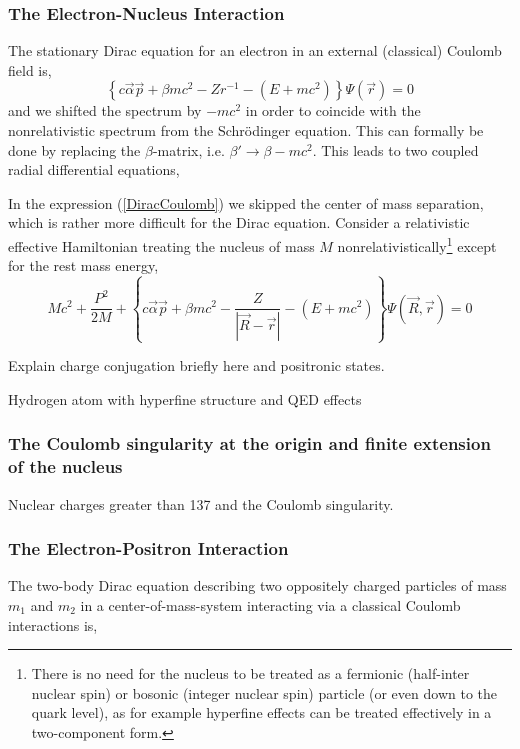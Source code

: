 \documentclass[12pt]{article}
\begin{document}
\subsubsection{\label{Hatom} \sffamily The Electron-Nucleus Interaction}
The stationary Dirac equation for an electron in an external (classical) Coulomb field is,
\begin{equation}
   \left\{ c \vec{\alpha} \vec{p} + \beta mc^2 - Zr^{-1} - \left( E + mc^2\right)\right\} \Psi (\vec{r}) = 0
   \label{DiracCoulomb}
\end{equation}
and we shifted the spectrum by $-mc^2$ in order to coincide with the nonrelativistic spectrum from the Schr\"odinger equation. This can formally be done by replacing the $\beta$-matrix, i.e. $\beta'\rightarrow\beta-mc^2$. This leads to two coupled radial differential equations,

In the expression (\ref{DiracCoulomb}) we skipped the center of mass separation, which is rather more difficult for the Dirac equation.\cite{Bechert-Meixner-1935,Breit-1948,Barker-Glover-1955,sapirstein-Yennie-1990} Consider a relativistic effective Hamiltonian treating the nucleus of mass $M$ nonrelativistically\footnote{There is no need for the nucleus to be treated as a fermionic (half-inter nuclear spin) or bosonic (integer nuclear spin) particle (or even down to the quark level), as for example hyperfine effects can be treated effectively in a two-component form.} except for the rest mass energy,
\begin{equation}
   Mc^2 + \frac{P^2}{2M} + \left\{ c \vec{\alpha} \vec{p} + \beta mc^2 - \frac{Z}{|\vec{R}-\vec{r}|} - \left( E + mc^2\right)\right\} \Psi (\vec{R},\vec{r}) = 0
   \label{DiracCoulomb}
\end{equation}

Explain charge conjugation briefly here and positronic states.

Hydrogen atom with hyperfine structure and QED effects

\subsubsection{\sffamily The Coulomb singularity at the origin and finite extension of the nucleus}
Nuclear charges greater than 137 and the Coulomb singularity.

\subsubsection{\sffamily The Electron-Positron Interaction}
The two-body Dirac equation describing two oppositely charged particles of mass $m_1$ and $m_2$ in a center-of-mass-system interacting via a classical Coulomb interactions is,
\end{document}

